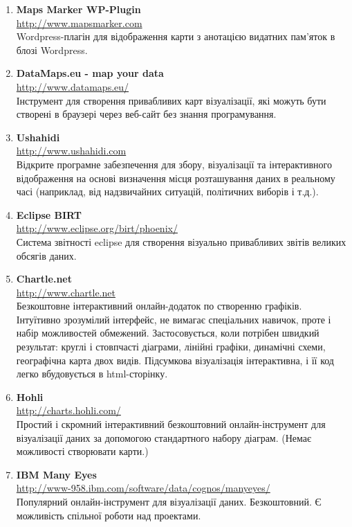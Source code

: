 \begin{enumerate}
    \item \textbf{Maps Marker WP-Plugin} \\
    \url{http://www.mapsmarker.com} \\
    Wordpress-плагін для відображення карти з анотацією видатних пам'яток в блозі Wordpress.

    \item \textbf{DataMaps.eu - map your data} \\
    \url{http://www.datamaps.eu/} \\
    Інструмент для створення привабливих карт візуалізації, які можуть бути створені в браузері через веб-сайт без знання програмування.

    \item \textbf{Ushahidi} \\
    \url{http://www.ushahidi.com} \\
    Відкрите програмне забезпечення для збору, візуалізації та інтерактивного відображення на основі визначення місця розташування даних в реальному часі (наприклад, від надзвичайних ситуацій, політичних виборів і т.д.).

    \item \textbf{Eclipse BIRT} \\
    \url{http://www.eclipse.org/birt/phoenix/} \\
    Система звітності eclipse для створення візуально привабливих звітів великих обсягів даних.

    \item \textbf{Chartle.net} \\
    \url{http://www.chartle.net} \\
    Безкоштовне інтерактивний онлайн-додаток по створенню графіків. Інтуїтивно зрозумілий інтерфейс, не вимагає спеціальних навичок, проте і набір можливостей обмежений. Застосовується, коли потрібен швидкий результат: круглі і стовпчасті діаграми, лінійні графіки, динамічні схеми, географічна карта двох видів. Підсумкова візуалізація інтерактивна, і її код легко вбудовується в html-сторінку.

    \item \textbf{Hohli} \\
    \url{http://charts.hohli.com/} \\
    Простий і скромний інтерактивний безкоштовний онлайн-інструмент для візуалізації даних за допомогою стандартного набору діаграм. (Немає можливості створювати карти.)

    \item \textbf{IBM Many Eyes} \\
    \url{http://www-958.ibm.com/software/data/cognos/manyeyes/} \\
    Популярний онлайн-інструмент для візуалізації даних. Безкоштовний. Є можливість спільної роботи над проектами.


\end{enumerate}
